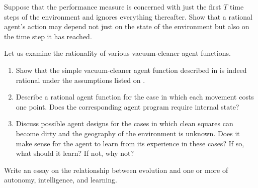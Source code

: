
\begin{uexercise}
Suppose that the performance measure is concerned with just the first \(T\) time steps of the environment and ignores everything thereafter.
Show that a rational agent's action may depend not just on the state of the environment but also on the time step it has reached.
\end{uexercise} 

\begin{exercise}%
Let us examine the rationality of various vacuum-cleaner agent functions.
\begin{enumerate}
\item Show that the simple vacuum-cleaner agent function described in
 is indeed rational
under the assumptions listed on .
\item Describe a rational agent function for the case in which
each movement costs one point. Does the corresponding agent program require internal state?
\item Discuss possible agent designs for
the cases in which clean squares can become dirty and the geography
of the environment is unknown. Does it make sense for the agent to
learn from its experience in these cases? If so, what should it learn?
If not, why not?
\end{enumerate}
\end{exercise} 

\begin{iexercise}\libex
Write an essay on the relationship between evolution and one or more of autonomy, intelligence, and learning.
\end{iexercise} 





